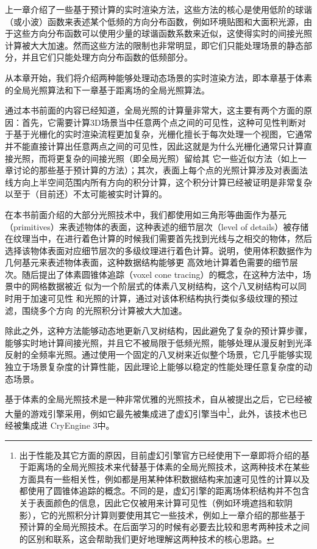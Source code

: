上一章介绍了一些基于预计算的实时渲染方法，这些方法的核心是使用低阶的球谐（或小波）函数来表述某个低频的方向分布函数，例如环境贴图和大面积光源，由于这些方向分布函数可以使用少量的球谐函数系数来近似，这使得实时的间接光照计算被大大加速。然而这些方法的限制也非常明显，即它们只能处理场景的静态部分，并且它们只能处理方向分布函数的低频部分。

从本章开始，我们将介绍两种能够处理动态场景的实时渲染方法，即本章基于体素的全局光照算法和下一章基于距离场的全局光照算法。

通过本书前面的内容已经知道，全局光照的计算量非常大，这主要有两个方面的原因：首先，它需要计算3D场景当中任意两个点之间的可见性，这种可见性判断对于基于光栅化的实时渲染流程更加复杂，光栅化擅长于每次处理一个视图，它通常并不能直接计算出任意两点之间的可见性，因此这就是为什么光栅化通常只计算直接光照，而将更复杂的间接光照（即全局光照）留给其 它一些近似方法（如上一章讨论的那些基于预计算的方法）；其次，表面上每个点的光照计算涉及对表面法线方向上半空间范围内所有方向的积分计算，这个积分计算已经被证明是非常复杂以至于（目前还）不太可能被实时计算的。

在本书前面介绍的大部分光照技术中，我们都使用如三角形等曲面作为基元（primitives）来表述物体的表面，这种表述的细节层次（level of details）被存储在纹理当中，在进行着色计算的时候我们需要首先找到光线与之相交的物体，然后选择该物体表面对应细节层次的多级纹理进行着色计算。\cite{a:GigaVoxels:RayGuidedStreamingforEfficientandDetailedVoxelRendering}说明，使用体积数据作为几何基元来表述物体表面，这种数据结构能够更 高效地计算着色需要的细节层次。随后\cite{a:InteractiveIndirectIlluminationUsingVoxelConeTracing}提出了体素圆锥体追踪（voxel cone tracing）的概念，在这种方法中，场景中的网格数据被近 似为一个阶层式的体素八叉树结构，这个八叉树结构可以同时用于加速可见性 和光照的计算，通过对该体积结构执行类似多级纹理的预过滤，围绕多个方向 的光照积分计算被大大加速。

除此之外，这种方法能够动态地更新八叉树结构，因此避免了复杂的预计算步骤，能够实时地计算间接光照，并且它不被局限于低频光照，能够处理从漫反射到光泽反射的全频率光照。通过使用一个固定的八叉树来近似整个场景，它几乎能够实现独立于场景复杂度的计算性能，因此理论上能够以稳定的性能处理任意复杂度的动态场景。

基于体素的全局光照技术是一种非常优雅的光照技术，自从被提出之后，它已经被大量的游戏引擎采用，例如它最先被集成进了虚幻引擎\cite{a:TheTechnologyBehindtheUnrealEngine4Elementaldemo}当中\footnote{出于性能及其它方面的原因，目前虚幻引擎官方已经使用下一章即将介绍的基于距离场的全局光照技术来代替基于体素的全局光照技术，这两种技术在某些方面具有一些相关性，例如都是用某种体积数据结构来加速可见性的计算以及都使用了圆锥体追踪的概念。不同的是，虚幻引擎的距离场体积结构并不包含关于表面颜色的信息，因此它仅被用来计算可见性（例如环境遮挡和软阴影），它的光照积分计算则要使用其它一些技术，例如上一章介绍的那些基于预计算的全局光照技术。在后面学习的时候有必要去比较和思考两种技术之间的区别和联系，这会帮助我们更好地理解这两种技术的核心思路。}，此外，该技术也已经被集成进 CryEngine 3中。



